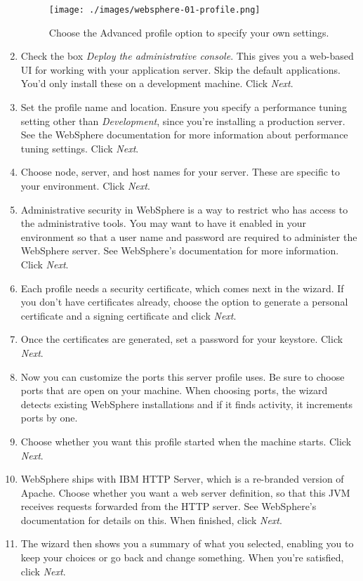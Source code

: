 \begin{enumerate}
  \begin{figure}
  \centering
  \texttt{[image: ./images/websphere-01-profile.png]}
  \caption{Choose the Advanced profile option to specify your own
  settings.}
  \end{figure}
\item
  Check the box \emph{Deploy the administrative console}. This gives you
  a web-based UI for working with your application server. Skip the
  default applications. You'd only install these on a development
  machine. Click \emph{Next}.
\item
  Set the profile name and location. Ensure you specify a performance
  tuning setting other than \emph{Development}, since you're installing
  a production server. See the WebSphere documentation for more
  information about performance tuning settings. Click \emph{Next}.
\item
  Choose node, server, and host names for your server. These are
  specific to your environment. Click \emph{Next}.
\item
  Administrative security in WebSphere is a way to restrict who has
  access to the administrative tools. You may want to have it enabled in
  your environment so that a user name and password are required to
  administer the WebSphere server. See WebSphere's documentation for
  more information. Click \emph{Next}.
\item
  Each profile needs a security certificate, which comes next in the
  wizard. If you don't have certificates already, choose the option to
  generate a personal certificate and a signing certificate and click
  \emph{Next}.
\item
  Once the certificates are generated, set a password for your keystore.
  Click \emph{Next}.
\item
  Now you can customize the ports this server profile uses. Be sure to
  choose ports that are open on your machine. When choosing ports, the
  wizard detects existing WebSphere installations and if it finds
  activity, it increments ports by one.
\item
  Choose whether you want this profile started when the machine starts.
  Click \emph{Next}.
\item
  WebSphere ships with IBM HTTP Server, which is a re-branded version of
  Apache. Choose whether you want a web server definition, so that this
  JVM receives requests forwarded from the HTTP server. See WebSphere's
  documentation for details on this. When finished, click \emph{Next}.
\item
  The wizard then shows you a summary of what you selected, enabling you
  to keep your choices or go back and change something. When you're
  satisfied, click \emph{Next}.
\end{enumerate}

